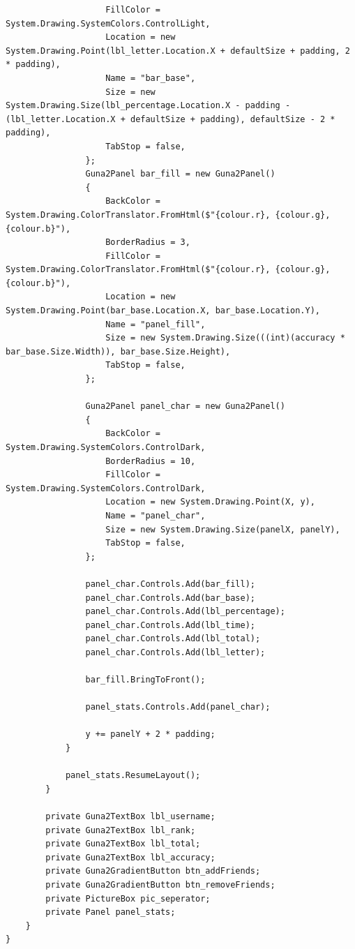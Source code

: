 \documentclass{article}
\begin{document}
\begin{verbatim}
					FillColor = System.Drawing.SystemColors.ControlLight,
					Location = new System.Drawing.Point(lbl_letter.Location.X + defaultSize + padding, 2 * padding),
					Name = "bar_base",
					Size = new System.Drawing.Size(lbl_percentage.Location.X - padding - (lbl_letter.Location.X + defaultSize + padding), defaultSize - 2 * padding),
					TabStop = false,
				};
				Guna2Panel bar_fill = new Guna2Panel()
				{
					BackColor = System.Drawing.ColorTranslator.FromHtml($"{colour.r}, {colour.g}, {colour.b}"),
					BorderRadius = 3,
					FillColor = System.Drawing.ColorTranslator.FromHtml($"{colour.r}, {colour.g}, {colour.b}"),
					Location = new System.Drawing.Point(bar_base.Location.X, bar_base.Location.Y),
					Name = "panel_fill",
					Size = new System.Drawing.Size(((int)(accuracy * bar_base.Size.Width)), bar_base.Size.Height),
					TabStop = false,
				};

				Guna2Panel panel_char = new Guna2Panel()
				{
					BackColor = System.Drawing.SystemColors.ControlDark,
					BorderRadius = 10,
					FillColor = System.Drawing.SystemColors.ControlDark,
					Location = new System.Drawing.Point(X, y),
					Name = "panel_char",
					Size = new System.Drawing.Size(panelX, panelY),
					TabStop = false,
				};

				panel_char.Controls.Add(bar_fill);
				panel_char.Controls.Add(bar_base);
				panel_char.Controls.Add(lbl_percentage);
				panel_char.Controls.Add(lbl_time);
				panel_char.Controls.Add(lbl_total);
				panel_char.Controls.Add(lbl_letter);

				bar_fill.BringToFront();
				
				panel_stats.Controls.Add(panel_char);

				y += panelY + 2 * padding;
			}

			panel_stats.ResumeLayout();
		}

		private Guna2TextBox lbl_username;
		private Guna2TextBox lbl_rank;
		private Guna2TextBox lbl_total;
		private Guna2TextBox lbl_accuracy;
		private Guna2GradientButton btn_addFriends;
		private Guna2GradientButton btn_removeFriends;
		private PictureBox pic_seperator;
		private Panel panel_stats;
	}
}
\end{verbatim}
\end{document}
